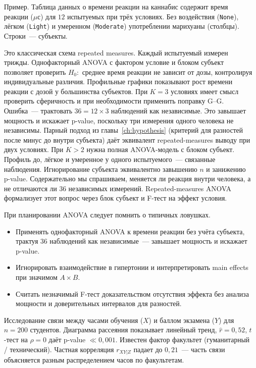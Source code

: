 Пример. Таблица данных о времени реакции на каннабис содержит время реакции ($\mu$с) для $12$ испытуемых при трёх условиях. Без воздействия (\texttt{None}), лёгком (\texttt{Light}) и умеренном (\texttt{Moderate}) употреблении марихуаны (столбцы). Строки~--- субъекты.

Это классическая схема repeated measures. Каждый испытуемый измерен трижды.
Однофакторный ANOVA с фактором условие и блоком субъект позволяет проверить $H_0\colon$ среднее время реакции не зависит от дозы, контролируя индивидуальные различия.
Профильные графики показывают рост времени реакции с дозой у большинства субъектов. При $K=3$ условиях имеет смысл проверить сферичность и при необходимости применить поправку G--G.
Ошибка~--- трактовать $36=12\times 3$ наблюдений как независимые. Это завышает мощность и искажает p-value, поскольку три измерения одного человека не независимы.
Парный подход из главы~\ref{ch:hypothesis} (критерий для разностей после минус до внутри субъекта) даёт эквивалент repeated-measures выводу при двух условиях. При $K>2$ нужна полная ANOVA-модель с блоком субъект.
Профиль до, лёгкое и умеренное у одного испытуемого~--- связанные наблюдения. Игнорирование субъекта эквивалентно завышению $n$ и занижению p-value.
Содержательно мы спрашиваем, меняется ли реакция внутри человека, а не отличаются ли 36 независимых измерений.
Repeated-measures ANOVA формализует этот вопрос через блок субъект и F-тест на эффект условия.

При планировании ANOVA следует помнить о типичных ловушках.
\begin{itemize}
    \item Применять однофакторный ANOVA к времени реакции без учёта
          субъекта, трактуя $36$ наблюдений как независимые~--- завышает мощность и искажает p-value.
    \item Игнорировать взаимодействие в гипертонии и
          интерпретировать main effects при значимом $A\times B$.
    \item Считать незначимый F-тест доказательством отсутствия эффекта
          без анализа мощности и доверительных интервалов для разностей.
\end{itemize}

Исследование связи между часами обучения ($X$) и баллом экзамена ($Y$) для $n=200$ студентов.
Диаграмма рассеяния показывает линейный тренд, $\hat r=0{,}52$, $t$-тест на $\rho=0$ даёт p-value $\ll 0{,}001$.
Известен фактор факультет (гуманитарный / технический). Частная корреляция $r_{XY|Z}$ падает до $0{,}21$~--- часть связи объясняется разным распределением часов по факультетам.

